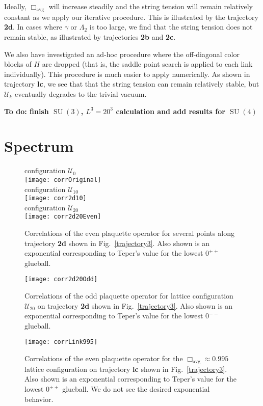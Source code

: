 \documentclass[preprint,aps,prd]{revtex4-2}
\newcommand{\plaquette}{\Box}
\newcommand{\config}{\mathcal{U}}
\DeclareMathOperator{\SU}{SU}
\begin{document}
Ideally, $\plaquette_\mathrm{avg}$ will increase steadily and the string tension will remain relatively constant as we apply our iterative procedure.
This is illustrated by the trajectory {\bf 2d}.
In cases where $\gamma$ or $\Lambda_2$ is too large, we find that the
string tension does not remain stable, as illustrated by
trajectories {\bf 2b} and {\bf 2c}.

We also have investigated an ad-hoc procedure where
the off-diagonal color blocks of $H$ are dropped (that is, the
saddle point search is applied to each link individually).
This procedure is much easier to apply numerically.
As shown in trajectory {\bf lc},
we see that that the string tension can remain relatively stable,
but $\config_k$ eventually degrades to the trivial vacuum.

{\bf  To do:
  finish $\SU(3)$, $L^3=20^3$ calculation and
  add results for $\SU(4)$}


\section{Spectrum}

\begin{figure}
   configuration $\config_0$\\
   \texttt{[image: corrOriginal]}\\
   configuration $\config_{10}$\\
   \texttt{[image: corr2d10]}\\
   configuration $\config_{20}$\\
   \texttt{[image: corr2d20Even]}
\caption{Correlations of the even plaquette operator for several points
  along trajectory {\bf 2d} shown in Fig.~\ref{trajectory3}.
  Also shown is an exponential corresponding to Teper's value
  for the lowest $0^{++}$ glueball.
  \label{corr2dEven}}
\end{figure}

\begin{figure}
   \texttt{[image: corr2d20Odd]}
   \caption{Correlations of the odd plaquette operator for
     lattice configuration
     $\config_{20}$ on trajectory {\bf 2d} shown in Fig.~\ref{trajectory3}.
  Also shown is an exponential corresponding to Teper's value
  for the lowest $0^{--}$ glueball.
  \label{corr2dOdd}}
\end{figure}

\begin{figure}
   \texttt{[image: corrLink995]}
   \caption{Correlations of the even plaquette operator for
     the $\plaquette_\mathrm{avg} \approx 0.995$ lattice configuration
     on trajectory {\bf lc} shown in Fig.~\ref{trajectory3}.
    Also shown is an exponential corresponding to Teper's value
     for the lowest $0^{++}$ glueball.
     We do not see the desired exponential behavior.
  \label{corrLink995}}
\end{figure}
\end{document}

